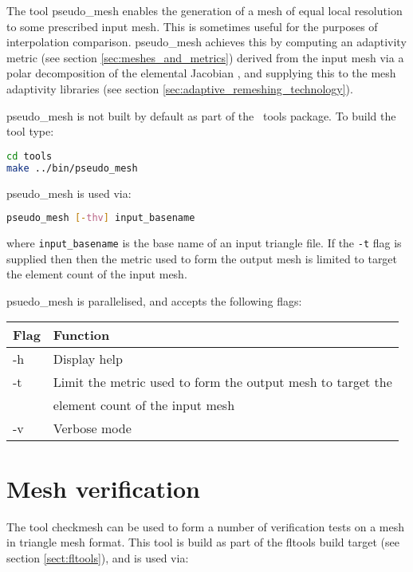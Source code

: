 The tool pseudo\_mesh enables the generation of a mesh of equal local resolution
to some prescribed input mesh. This is sometimes useful for the purposes of
interpolation comparison. pseudo\_mesh achieves this by computing an adaptivity
metric (see section \ref{sec:meshes_and_metrics}) derived from the input mesh
via a polar decomposition of the
elemental Jacobian \citep{micheletti2006}, and supplying this to the mesh adaptivity libraries
(see section \ref{sec:adaptive_remeshing_technology}).

pseudo\_mesh is not built by default as part of the \fluidity\ tools package. To
build the tool type:

\begin{lstlisting}[language = Bash]
cd tools
make ../bin/pseudo_mesh
\end{lstlisting}

pseudo\_mesh is used via:

\begin{lstlisting}[language = Bash]
pseudo_mesh [-thv] input_basename
\end{lstlisting}

where \lstinline[language = Bash]*input_basename* is the base name of an input
triangle file. If the \lstinline[language = Bash]*-t* flag is supplied then
then the metric used to form the output mesh is limited to target the element
count of the input mesh.

psuedo\_mesh is parallelised, and accepts the following flags:

\begin{center}
  \begin{tabular}{| l | l |}
    \hline
    Flag & Function \\
    \hline
    -h   & Display help \\
    -t   & Limit the metric used to form the output mesh to target the \\
         & element count of the input mesh \\
    -v   & Verbose mode \\
    \hline
  \end{tabular}
\end{center}

\section{Mesh verification}

The tool checkmesh can be used to form a number of verification tests on a mesh
in triangle mesh format. This tool is build as part of the fltools build target
(see section \ref{sect:fltools}), and is used via:

